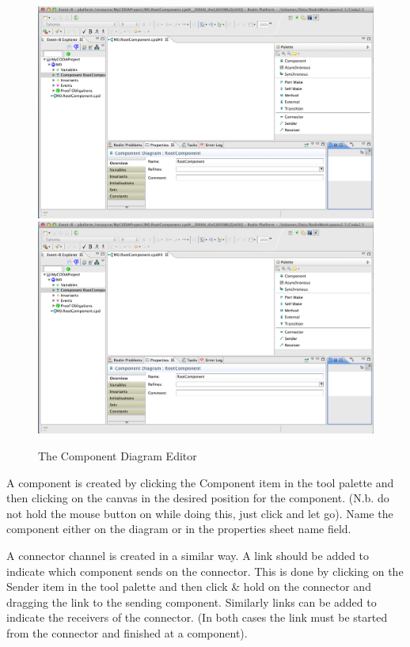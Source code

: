 \begin{figure}[!htbp]
  \centering
  \ifplastex
  \includegraphics[width=1024]{figures/image5.png}
  \else
  \includegraphics[width=1.0\textwidth]{figures/image5.png}
  \fi
  \caption{The Component Diagram Editor}
  \label{fig:TheComponentDiagramEditor}
\end{figure}


A component is created by clicking the Component item in the tool palette and then clicking on the canvas in the desired position for the component. (N.b. do not hold the mouse button on while doing this, just click and let go). Name the component either on the diagram or in the properties sheet name field.


A connector channel is created in a similar way. A link should be added to indicate which component sends on the connector. This is done by clicking on the Sender item in the tool palette and then click \& hold on the connector and dragging the link to the sending component. Similarly links can be added to indicate the receivers of the connector. (In both cases the link must be started from the connector and finished at a component).


